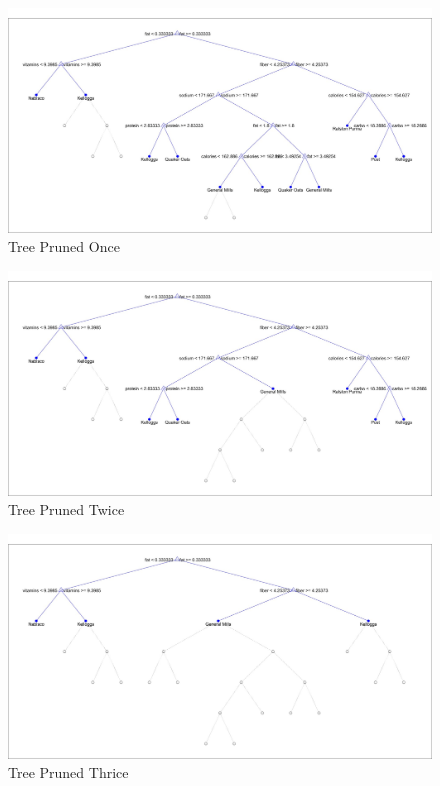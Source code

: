 \documentclass[12pt,english,letterpaper]{article}
\begin{document}
\begin{figure}[tbp!]
    \centering
    \includegraphics[width=\linewidth]{Cereal Tree Pruned 1.jpg}
    \caption{Tree Pruned Once}
    \label{fig:prune1}
\end{figure}

\begin{figure}[tbp!]
    \centering
    \includegraphics[width=\linewidth]{Cereal Tree Pruned 2.jpg}
    \caption{Tree Pruned Twice}
    \label{fig:prune2}
\end{figure}

\begin{figure}[tbp!]
    \centering
    \includegraphics[width=\linewidth]{Cereal Tree Pruned 3.jpg}
    \caption{Tree Pruned Thrice}
    \label{fig:prune3}
\end{figure}
\end{document}
